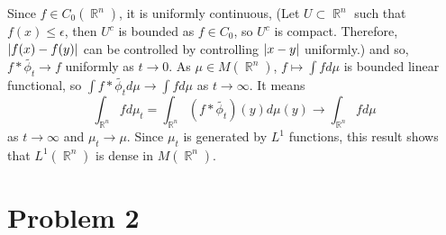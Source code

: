 \documentclass{article}
\DeclareMathOperator{\rr}{\mathbb{R}}
\begin{document}
Since $f\in C_0(\rr^n)$, it is uniformly continuous, (Let $U\subset \rr^n$ such that $f(x)\leq \epsilon$, then $U^c$ is bounded as $f\in C_0$, so $U^c$ is compact. Therefore, $\abs{f(x)-f(y)}$ can be controlled by controlling $\abs{x-y}$ uniformly.) and so, $f*\tilde{\phi_t}\rightarrow f$ uniformly as $t\rightarrow 0$. As $\mu\in M(\rr^n)$, $f\mapsto \int fd\mu$ is bounded linear functional, so $\int f*\tilde{\phi_t} d\mu\rightarrow \int f d\mu$ as $t\rightarrow \infty$. It means
\begin{equation*}
\int_{\rr^n} fd\mu_t=\int_{\rr^n} (f*\tilde{\phi_t})(y)d\mu(y)\rightarrow \int_{\rr^n} fd\mu
\end{equation*}
as $t\rightarrow \infty$ and $\mu_t\rightarrow\mu$. Since $\mu_t$ is generated by $L^1$ functions, this result shows that $L^1(\rr^n)$ is dense in $M(\rr^n)$.
\section*{Problem 2}
\end{document}
